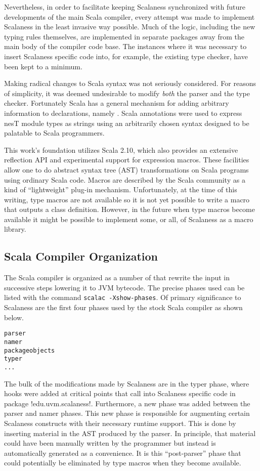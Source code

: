 Nevertheless, in order to facilitate keeping Scalaness synchronized with future developments of
the main Scala compiler, every attempt was made to implement Scalaness in the least invasive way
possible. Much of the logic, including the new typing rules themselves, are implemented in
separate packages away from the main body of the compiler code base. The instances where it was
necessary to insert Scalaness specific code into, for example, the existing type checker, have
been kept to a minimum.

Making radical changes to Scala syntax was not seriously considered. For reasons of simplicity,
it was deemed undesirable to modify \emph{both} the parser and the type checker. Fortunately
Scala has a general mechanism for adding arbitrary information to declarations, namely
. Scala annotations were used to express nesT module types as strings using
an arbitrarily chosen syntax designed to be palatable to Scala programmers.

This work's foundation utilizes Scala 2.10, which also provides an extensive reflection API
and experimental support for expression macros. These facilities allow one to do abstract syntax
tree (AST) transformations on Scala programs using ordinary Scala code. Macros are described by
the Scala community as a kind of ``lightweight'' plug-in mechanism. Unfortunately, at the time of
this writing, type macros are not available so it is not yet possible to write a macro that
outputs a class definition. However, in the future when type macros become available it might be
possible to implement some, or all, of Scalaness as a macro library.

\subsection{Scala Compiler Organization}
\label{section-scala-compiler-organization}

The Scala compiler is organized as a number of  that rewrite the input in
successive steps lowering it to JVM bytecode. The precise phases used can be listed with the
command \texttt{scalac -Xshow-phases}. Of primary significance to Scalaness are the first four
phases used by the stock Scala compiler as shown below.

\singlespace
\begin{Verbatim}
parser
namer
packageobjects
typer
...
\end{Verbatim}
\primaryspacing

The bulk of the modifications made by Scalaness are in the typer phase, where hooks were added
at critical points that call into Scalaness specific code in package !edu.uvm.scalaness!. Furthermore, 
a new phase was added between the parser and namer phases. This new phase is
responsible for augmenting certain Scalaness constructs with their necessary runtime support.
This is done by inserting material in the AST produced by the parser. In principle, that material
could have been manually written by the programmer but instead is automatically generated as a
convenience. It is this ``post-parser'' phase that could potentially be eliminated by type
macros when they become available.

